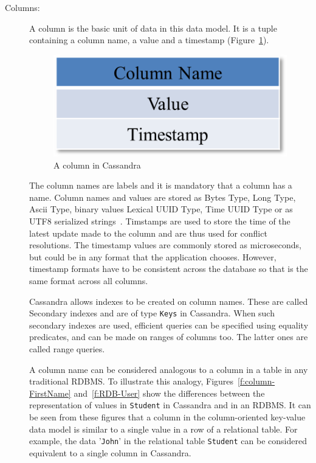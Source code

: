 \begin{description}
\item[Columns:]  A column is the basic unit of data in this data model.  It is a
tuple containing a column name,   a value and a timestamp (Figure~\ref{f:column}). 

\begin{figure}[h]
	\centering
	\includegraphics[width=.4\textwidth]{./figure/Example/Column.png}
	\caption{A column in Cassandra}\label{f:column}
\end{figure}

The column names are labels  and it is mandatory that a column has a name. 
Column names and values are stored as Bytes Type,   Long Type, Ascii Type,  
binary values Lexical UUID Type,   Time UUID Type or as UTF8 serialized
strings~\citep{BOOK,datastaxDataModel}.  Timstamps are used to store the time of
the latest update made to the column and are thus used for conflict resolutions.  The timestamp values are commonly stored as microseconds,   but could be in any format that the
application chooses.  However,   timestamp formats have to be consistent across
the database so that is the same format across all columns.

Cassandra allows indexes to be created on column names.  These are called
Secondary indexes and are of type \texttt{Keys} in Cassandra.  When such
secondary indexes are used,   efficient queries can be specified using equality
predicates,   and can be made on ranges of columns too.  The latter ones are
called range queries.

A column name can be considered analogous to a column in a table in any
traditional \ac{RDBMS}.  To illustrate this analogy,
Figures~\ref{f:column-FirstName} and~\ref{f:RDB-User} show the differences
between the representation of values in \texttt{Student} in Cassandra and in an
\ac{RDBMS}.
It can be seen from these figures that a column in the column-oriented key-value
data model is similar to a single value in a row of a relational table.  For
example,   the data '\texttt{John}' in the relational table \texttt{Student} can
be considered equivalent to a single column in Cassandra.


\end{description}
